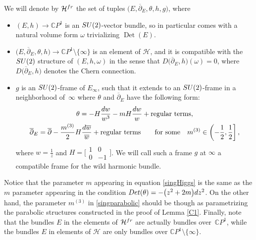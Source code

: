 \documentclass[11pt]{article}
\numberwithin{equation}{section}
\numberwithin{equation}{section}
\newcommand{\CP}{\mathbb{C}P^1}
\begin{document}
\begin{Definition}\label{maindef}
We will denote by $\mathcal{H}^{{\rm fr}}$ the set of tuples $\bigl(E,\overline{\partial}_E,\theta,h,g\bigr)$, where
\begin{itemize}\itemsep=0pt
 \item $(E,h)\to \CP$ is an ${\rm SU}(2)$-vector bundle, so in particular comes with a natural volume form $\omega$ trivializing $\operatorname{Det}(E)$.
 \item $\bigl(E,\overline{\partial}_E,\theta,h\bigr)\to \CP \setminus \{\infty\}$ is an element of $\mathcal{H}$, and it is compatible with the ${\rm SU}(2)$ structure of $(E,h,\omega)$ in the sense that $D\bigl(\overline{\partial}_E,h\bigr)(\omega)=0$, where $D\bigl(\overline{\partial}_E,h\bigr)$ denotes the Chern connection.
 \item $g$ is an ${\rm SU}(2)$-frame of $E_\infty$, such that it extends to an ${\rm SU}(2)$-frame in a neighborhood of~$\infty$ where $\theta$ and $\overline{\partial}_E$ have the following form:
\begin{gather}
 \theta= -H\frac{{\rm d}w}{w^3}-mH\frac{{\rm d}w}{w}+\text{regular terms},\label{singHiggs}
\\
 \overline{\partial}_E=\overline{\partial}-\frac{m^{(3)}}{2}H\frac{{\rm d}\overline{w}}{\overline{w}}+\text{regular terms} \qquad \text{for some}\quad m^{(3)}\in \left(-\frac{1}{2},\frac{1}{2}\right],\label{singparabolic}
 \end{gather}
 where $w=\frac{1}{z}$ and $H=\bigl[\begin{smallmatrix}
 1&0\\
 0&-1\end{smallmatrix}\bigr]$.
 We will call such a frame $g$ at $\infty$ a compatible frame for the wild harmonic bundle.
\end{itemize}
\end{Definition}

Notice that the parameter $m$ appearing in equation \eqref{singHiggs} is the same as the $m$ parameter appearing in the condition $\textnormal{Det}(\theta)=-\bigl(z^2+2m\bigr){\rm d}z^2$. On the other hand, the parameter $m^{(3)}$ in \eqref{singparabolic} should be though as parametrizing the parabolic structures constructed in the proof of Lemma \ref{C1}. Finally, note that the bundles $E$ in the elements of $\mathcal{H}^{{\rm fr}}$ are actually bundles over~$\CP$, while the bundles $E$ in elements of $\mathcal{H}$ are only bundles over $\CP \setminus \{\infty\}$.
\end{document}

